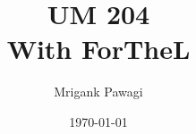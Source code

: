 \documentclass{article}
\title{UM 204 \\
{\Large With ForTheL}}
\author{Mrigank Pawagi}
\date{\today}
\begin{document}
\maketitle
\tableofcontents
\pagebreak


\end{document}
